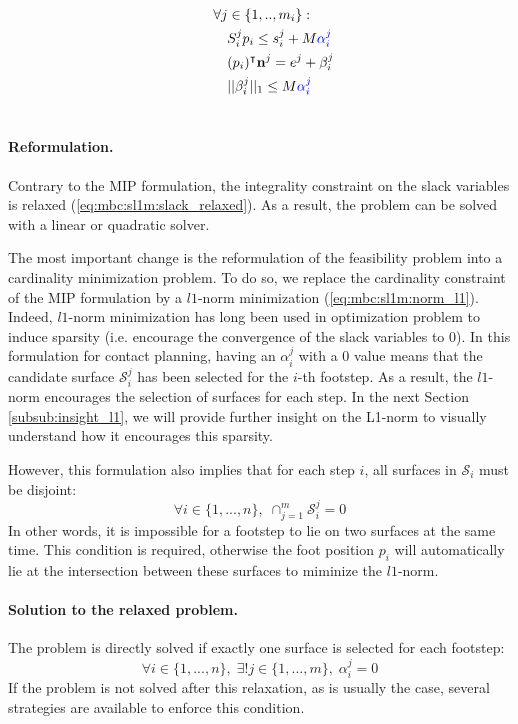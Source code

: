\begin{align}
                                \quad & \quad \forall j \in \{1,..,m_i\} : \nonumber\\
                                    \quad & \quad \quad S_i^j p_i \leq s_i^j + M \textcolor{blue}{\alpha_i^j}  \nonumber\\
                                    \quad & \quad \quad (p_i)^{\intercal} \textbf{n}^j = e^j + \beta_i^j \nonumber\\
                                    \quad & \quad \quad ||\beta_i^j||_1 \leq M \textcolor{blue}{\alpha_i^j} \nonumber\\
                                    \nonumber
\end{align}
\paragraph{Reformulation.}
Contrary to the MIP formulation, the integrality constraint on the slack variables is relaxed (\ref{eq:mbc:sl1m:slack_relaxed}). 
As a result, the problem can be solved with a linear or quadratic solver.

The most important change is the reformulation of the feasibility problem into a cardinality minimization problem.
To do so, we replace the cardinality constraint of the MIP formulation by a $l1$-norm minimization (\ref{eq:mbc:sl1m:norm_l1}).
Indeed, $l1$-norm minimization has long been used in optimization problem to induce sparsity (i.e. encourage the convergence of the slack variables to 0). 
In this formulation for contact planning, having an $\alpha_i^j$ with a 0 value means that the candidate surface $\mathcal{S}_i^j$ has been selected for the $i$-th footstep. 
As a result, the $l1$-norm encourages the selection of surfaces for each step.
In the next Section \ref{subsub:insight_l1}, we will provide further insight on the L1-norm to visually understand how it encourages this sparsity.

However, this formulation also implies that for each step $i$, all surfaces in $\mathcal{S}_i$ must be disjoint:
\begin{equation}
    \forall i \in \{1,...,n\},\; \cap^m_{j=1} \mathcal{S}^j_i = 0
\end{equation}
In other words, it is impossible for a footstep to lie on two surfaces at the same time. This condition is required, otherwise the foot position $p_i$ will automatically lie at the intersection between these surfaces to miminize the $l1$-norm.


\paragraph{Solution to the relaxed problem.\label{par:sl1m:solution_relaxed_heuristics}}
The problem is directly solved if exactly one surface is selected for each footstep:
\begin{equation}
    \label{eq:sl1m:pb_solved}
    \forall i \in \{1,...,n\},\; \exists! j \in \{1,...,m\},\; \alpha^j_i = 0
\end{equation}
If the problem is not solved after this relaxation, as is usually the case, several strategies are available to enforce this condition.

